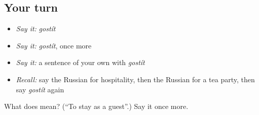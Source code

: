 \subsection*{Your turn}
\begin{itemize}
\raggedright
  \item \emph{Say it:} \emph{gostít}
  \item \emph{Say it:} \emph{gostít}, once more
  \item \emph{Say it:} a sentence of your own with \emph{gostít}
  \item \emph{Recall:} say the Russian for hospitality, then the Russian for a tea party, then say \emph{gostít} again
\end{itemize}

\begin{tcolorbox}[breakable,colback=teal!4,colframe=teal!35!black,title={Before you move on}]
What does  mean? (\textquotedblleft{}To stay as a guest\textquotedblright{}.) Say it once more.
\end{tcolorbox}
